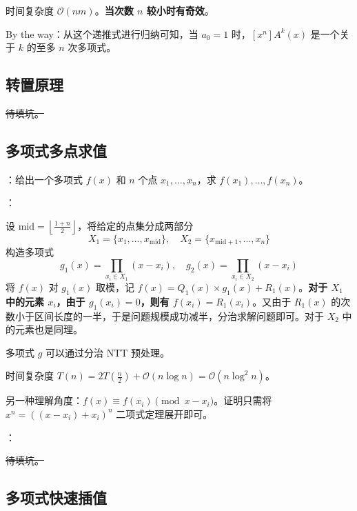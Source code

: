 时间复杂度 $\mathcal{O}(nm)$。\textbf{当次数 $n$ 较小时有奇效}。

\begin{quoteblock}
By the way：从这个递推式进行归纳可知，当 $a_0 = 1$ 时，$[x^n]A^k(x)$ 是一个关于 $k$ 的至多 $n$ 次多项式。
\end{quoteblock}

\subsection{转置原理}

\sout{待填坑。}

\subsection{多项式多点求值}

：给出一个多项式 $f(x)$ 和 $n$ 个点 $x_1, \dots, x_n$，求 $f(x_1), \dots, f(x_n)$。

：

设 $\mathrm{mid} = \left\lfloor \frac{1 + n}{2} \right\rfloor$，将给定的点集分成两部分
\[
X_1 = \{ x_1,  \dots, x_{\mathrm{mid}} \}, \quad X_2 = \{ x_{\mathrm{mid} + 1}, \dots, x_{n} \}
\]
构造多项式
\[
g_1(x) = \prod\limits_{x_i \in X_1}(x - x_i), \quad g_2(x) = \prod\limits_{x_i \in X_2}(x - x_i)
\]
将 $f(x)$ 对 $g_1(x)$ 取模，记 $f(x) = Q_1(x) \times g_1(x) + R_1(x)$。\textbf{对于 $X_1$ 中的元素 $x_i$，由于 $g_1(x_i) = 0$，则有 $f(x_i) = R_1(x_i)$}。又由于 $R_1(x)$ 的次数小于区间长度的一半，于是问题规模成功减半，分治求解问题即可。对于 $X_2$ 中的元素也是同理。

多项式 $g$ 可以通过分治 NTT 预处理。

时间复杂度 $T(n) = 2T(\frac{n}{2}) + \mathcal{O}(n \log n) = \mathcal{O}(n \log^2 n)$。

\begin{quoteblock}
另一种理解角度：$f(x) \equiv f(x_i) \pmod{x - x_i}$。证明只需将 $x^n = \left((x - x_i) + x_i\right)^n$ 二项式定理展开即可。
\end{quoteblock}


：

\sout{待填坑。}

\subsection{多项式快速插值}

